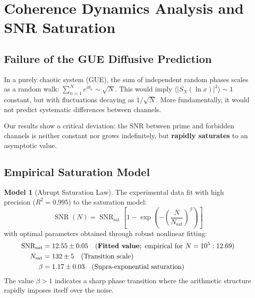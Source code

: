 \documentclass[12pt, a4paper]{article}
\theoremstyle{plain}
\theoremstyle{definition}
\newtheorem{modelo}[teorema]{Model} %
\theoremstyle{remark}
\newcommand{\SNR}{\operatorname{SNR}}
\begin{document}
\section{Coherence Dynamics Analysis and SNR Saturation}
\label{sec:analisis}

\subsection{Failure of the GUE Diffusive Prediction}
\label{subsec:fallo_gue}

In a purely chaotic system (GUE), the sum of independent random phases scales as a random walk: $\sum_{n=1}^N e^{i\theta_n} \sim \sqrt{N}$. This would imply $\langle |S_N(\ln x)|^2 \rangle \sim 1$ constant, but with fluctuations decaying as $1/\sqrt{N}$. More fundamentally, it would not predict systematic differences between channels.

Our results show a critical deviation: the SNR between prime and forbidden channels is neither constant nor grows indefinitely, but \textbf{rapidly saturates} to an asymptotic value.

\subsection{Empirical Saturation Model}
\label{subsec:modelo_saturacion}

\begin{modelo}[Abrupt Saturation Law]
The experimental data fit with high precision ($R^2 = 0.995$) to the saturation model:
\[
\SNR(N) = \SNR_{\text{sat}} \left[ 1 - \exp\left(-\left(\frac{N}{N_{\text{sat}}}\right)^\beta\right) \right]
\]
with optimal parameters obtained through robust nonlinear fitting:
\begin{align*}
\SNR_{\text{sat}} &= 12.55 \pm 0.05 \quad (\text{\textbf{Fitted value}}; \text{ empirical for } N=10^5: 12.69) \\
N_{\text{sat}} &= 132 \pm 5 \quad (\text{Transition scale}) \\
\beta &= 1.17 \pm 0.03 \quad (\text{Supra-exponential saturation})
\end{align*}
The value $\beta > 1$ indicates a sharp phase transition where the arithmetic structure rapidly imposes itself over the noise.
\end{modelo}
\end{document}
